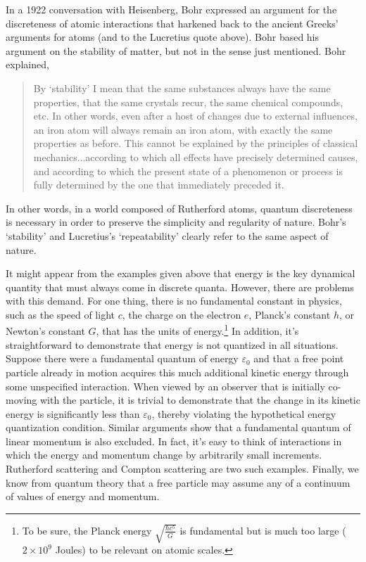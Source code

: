 \documentclass[12pt]{article}
\begin{document}
In a 1922 conversation with Heisenberg\cite{He1972}, Bohr expressed an argument for the discreteness of atomic interactions that harkened back to the ancient Greeks' arguments for atoms (and to the Lucretius quote above).  Bohr based his argument on the stability of matter, but not in the sense just mentioned.  Bohr explained, 
\begin{quote}
By `stability' I mean that the same substances always have the same properties, that the same crystals recur, the same chemical compounds, etc.  In other words, even after a host of changes due to external influences, an iron atom will always remain an iron atom, with exactly the same properties as before.  This cannot be explained by the principles of classical mechanics...according to which all effects have precisely determined causes, and according to which the present state of a phenomenon or process is fully determined by the one that immediately preceded it.
\end{quote}
In other words, in a world composed of Rutherford atoms, quantum discreteness is necessary in order to preserve the simplicity and regularity of nature.  Bohr's `stability' and Lucretius's `repeatability' clearly refer to the same aspect of nature.

It might appear from the examples given above that energy is the key dynamical quantity that must always come in discrete quanta.  However, there are problems with this demand.  For one thing, there is no fundamental constant in physics, such as the speed of light $c$, the charge on the electron $e$, Planck's constant $h$, or Newton's constant $G$, that has the units of energy.\footnote{To be sure, the Planck energy $\sqrt{\frac{\hbar c^{5}}{G}}$ is fundamental but is much too large ($2 \times 10^{9}$ Joules) to be relevant on atomic scales.} In addition, it's straightforward to demonstrate that energy is not quantized in all situations.  Suppose there were a fundamental quantum of energy $\varepsilon_{0}$ and that a free point particle already in motion acquires this much additional kinetic energy through some unspecified interaction.  When viewed by an observer that is initially co-moving with the particle, it is trivial to demonstrate that the change in its kinetic energy is significantly less than $\varepsilon_{0}$, thereby violating the hypothetical energy quantization condition.  Similar arguments show that a fundamental quantum of linear momentum is also excluded.  In fact, it's easy to think of interactions in which the energy and momentum change by arbitrarily small increments. Rutherford scattering and Compton scattering are two such examples.  Finally, we know from quantum theory that a free particle may assume any of a continuum of values of energy and momentum.
\end{document}
